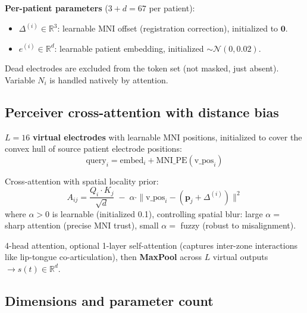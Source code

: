 \documentclass[11pt,letterpaper]{article}
\newcommand{\bfp}{\mathbf{p}}
\newcommand{\R}{\mathbb{R}}
\begin{document}
\textbf{Per-patient parameters} ($3 + d = 67$ per patient):
\begin{itemize}[leftmargin=2em]
\item $\Delta^{(i)} \in \R^3$: learnable MNI offset (registration correction), initialized to $\mathbf{0}$.
\item $e^{(i)} \in \R^d$: learnable patient embedding, initialized $\sim \mathcal{N}(0, 0.02)$.
\end{itemize}

Dead electrodes are excluded from the token set (not masked, just absent). Variable $N_i$ is handled natively by attention.

\subsection{Perceiver cross-attention with distance bias}

$L = 16$ \textbf{virtual electrodes} with learnable MNI positions, initialized to cover the convex hull of source patient electrode positions:
\begin{equation}
\text{query}_i = \text{embed}_i + \text{MNI\_PE}(\text{v\_pos}_i)
\end{equation}

Cross-attention with spatial locality prior:
\begin{equation}
\boxed{A_{ij} = \frac{Q_i \cdot K_j}{\sqrt{d}} \;-\; \alpha \cdot \|\text{v\_pos}_i - (\bfp_j + \Delta^{(i)})\|^2}
\end{equation}
where $\alpha > 0$ is learnable (initialized 0.1), controlling spatial blur: large $\alpha =$ sharp attention (precise MNI trust), small $\alpha =$ fuzzy (robust to misalignment).

4-head attention, optional 1-layer self-attention (captures inter-zone interactions like lip-tongue co-articulation), then \textbf{MaxPool} across $L$ virtual outputs $\to s(t) \in \R^d$.

\subsection{Dimensions and parameter count}
\end{document}
